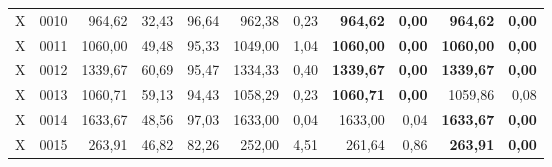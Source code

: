 \begin{longtable}{llrrrrrrrrr}
X & 0010 & 964,62 & 32,43 & 96,64 & 962,38 & 0,23 & \textbf{964,62} & \textbf{0,00} & \textbf{964,62} & \textbf{0,00} \\
X & 0011 & 1060,00 & 49,48 & 95,33 & 1049,00 & 1,04 & \textbf{1060,00} & \textbf{0,00} & \textbf{1060,00} & \textbf{0,00} \\
X & 0012 & 1339,67 & 60,69 & 95,47 & 1334,33 & 0,40 & \textbf{1339,67} & \textbf{0,00} & \textbf{1339,67} & \textbf{0,00} \\
X & 0013 & 1060,71 & 59,13 & 94,43 & 1058,29 & 0,23 & \textbf{1060,71} & \textbf{0,00} & 1059,86 & 0,08 \\
X & 0014 & 1633,67 & 48,56 & 97,03 & 1633,00 & 0,04 & 1633,00 & 0,04 & \textbf{1633,67} & \textbf{0,00} \\
X & 0015 & 263,91 & 46,82 & 82,26 & 252,00 & 4,51 & 261,64 & 0,86 & \textbf{263,91} & \textbf{0,00} \\
\end{longtable}

